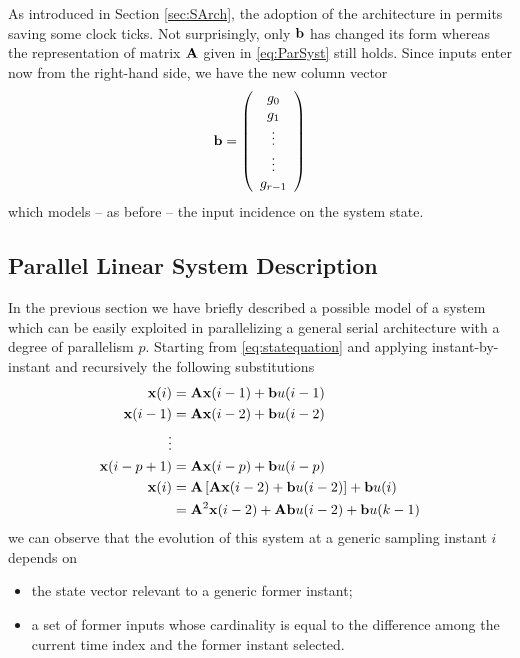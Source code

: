 As introduced in Section \ref{sec:SArch}, the adoption of the architecture in  permits saving some clock ticks. Not surprisingly, only $\mathbf{b} $ has changed its form whereas the representation of matrix $\mathbf{A}$ given in \eqref{eq:ParSyst} still holds. Since inputs enter now from the right-hand side, we have the new column vector
\begin{equation}\label{eq:vetb}
\mathbf{b} =
\left(
\begin{array}{c}
  g_0 \\
  g_1 \\
   \vdots \\
    \vdots \\
    g_{r-1}\\
\end{array}
\right)
\end{equation}
which models -- as before -- the input incidence on the system state.


\subsection{Parallel Linear System Description}

In the previous section we have briefly described a possible model of a system
which can be easily exploited in parallelizing a general serial architecture
with a degree of parallelism $p$. Starting from \eqref{eq:statequation} and
applying instant-by-instant and recursively the following substitutions
\begin{align*}
\mathbf{x}(i) &= \mathbf{Ax}(i-1) + \mathbf{b}u(i-1)\\
\mathbf{x}(i-1) &= \mathbf{Ax}(i-2) + \mathbf{b}u(i-2)\\
\vdots \\
\mathbf{x}(i-p+1) &= \mathbf{Ax}(i-p) + \mathbf{b}u(i-p)\\
\mathbf{x}(i) &= \mathbf{A} \left[ \mathbf{Ax}(i-2) + \mathbf{b}u(i-2)\right] + \mathbf{b}u(i)\\
&= \mathbf{A}^2 \mathbf{x} (i-2) + \mathbf{Ab} u(i-2) + \mathbf{b} u(k-1)
\end{align*}
we can observe that the evolution of this system at a generic sampling instant $i$ depends on
\begin{itemize}
\item the state vector relevant to a generic former instant;
\item a set of former inputs whose cardinality is equal to the difference among the current time index and the former instant selected.
\end{itemize}

